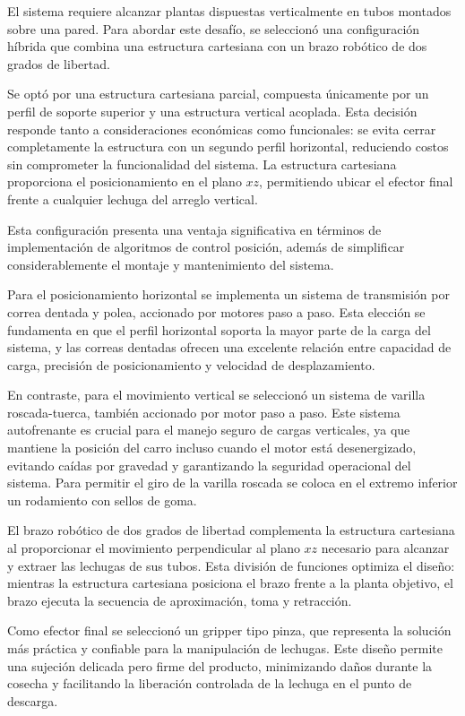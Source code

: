 El sistema requiere alcanzar plantas dispuestas verticalmente en tubos montados sobre una pared. Para abordar este desafío, se seleccionó una configuración híbrida que combina una estructura cartesiana con un brazo robótico de dos grados de libertad.

Se optó por una estructura cartesiana parcial, compuesta únicamente por un perfil de soporte superior y una estructura vertical acoplada. Esta decisión responde tanto a consideraciones económicas como funcionales: se evita cerrar completamente la estructura con un segundo perfil horizontal, reduciendo costos sin comprometer la funcionalidad del sistema. La estructura cartesiana proporciona el posicionamiento en el plano $xz$, permitiendo ubicar el efector final frente a cualquier lechuga del arreglo vertical.

Esta configuración presenta una ventaja significativa en términos de implementación de algoritmos de control posición, además de simplificar considerablemente el montaje y mantenimiento del sistema.

Para el posicionamiento horizontal se implementa un sistema de transmisión por correa dentada y polea, accionado por motores paso a paso. Esta elección se fundamenta en que el perfil horizontal soporta la mayor parte de la carga del sistema, y las correas dentadas ofrecen una excelente relación entre capacidad de carga, precisión de posicionamiento y velocidad de desplazamiento.

En contraste, para el movimiento vertical se seleccionó un sistema de varilla roscada-tuerca, también accionado por motor paso a paso. Este sistema autofrenante es crucial para el manejo seguro de cargas verticales, ya que mantiene la posición del carro incluso cuando el motor está desenergizado, evitando caídas por gravedad y garantizando la seguridad operacional del sistema. Para permitir el giro de la varilla roscada se coloca en el extremo inferior un rodamiento con sellos de goma.

El brazo robótico de dos grados de libertad complementa la estructura cartesiana al proporcionar el movimiento perpendicular al plano $xz$ necesario para alcanzar y extraer las lechugas de sus tubos. Esta división de funciones optimiza el diseño: mientras la estructura cartesiana posiciona el brazo frente a la planta objetivo, el brazo ejecuta la secuencia de aproximación, toma y retracción.

Como efector final se seleccionó un gripper tipo pinza, que representa la solución más práctica y confiable para la manipulación de lechugas. Este diseño permite una sujeción delicada pero firme del producto, minimizando daños durante la cosecha y facilitando la liberación controlada de la lechuga en el punto de descarga.

